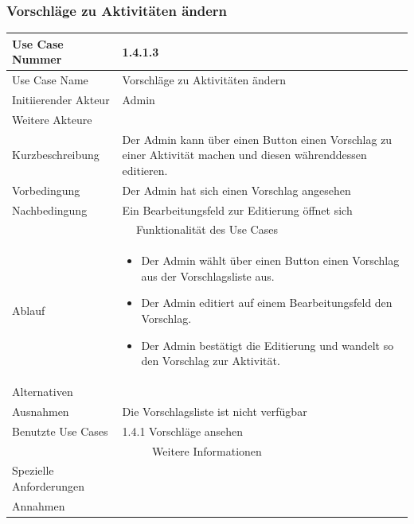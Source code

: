 \documentclass[10pt,a4paper]{article}
\begin{document}
	\subsubsection{Vorschl\"age zu Aktivit\"aten \"andern}
	\begin{tabular}{|l|p{.5\linewidth}|}
		\hline Use Case Nummer & 1.4.1.3 \\ 
		\hline Use Case Name & Vorschl\"age zu Aktivit\"aten \"andern \\ 
		\hline Initiierender Akteur & Admin \\
		\hline Weitere Akteure & \\
		\hline Kurzbeschreibung & Der Admin kann über einen Button einen Vorschlag zu einer Aktivit\"at machen und diesen währenddessen editieren. \\
		\hline Vorbedingung & Der Admin hat sich einen Vorschlag angesehen \\
		\hline Nachbedingung & Ein Bearbeitungsfeld zur Editierung öffnet sich\\
		\hline \multicolumn{2}{|c|}{Funktionalität des Use Cases}\\
		\hline Ablauf & \begin{itemize}
			\item Der Admin wählt über einen Button einen Vorschlag aus der Vorschlagsliste aus.
			\item Der Admin editiert auf einem Bearbeitungsfeld den Vorschlag.
			\item Der Admin bestätigt die Editierung und wandelt so den Vorschlag zur Aktivit\"at.
		\end{itemize} \\
		\hline Alternativen &  \\
		\hline Ausnahmen & Die Vorschlagsliste ist nicht verf\"ugbar \\
		\hline Benutzte Use Cases & 1.4.1 Vorschl\"age ansehen \\
		\hline \multicolumn{2}{|c|}{Weitere Informationen} \\
		\hline Spezielle Anforderungen &  \\
		\hline Annahmen &  \\
		\hline
	\end{tabular}
\end{document}
